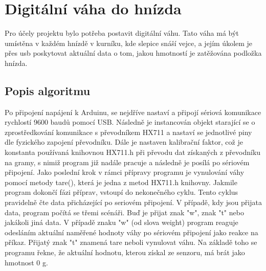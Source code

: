 \section{Digitální váha do hnízda}\label{sec:digitalni-vaha-do-hnizda}
Pro účely projektu bylo potřeba postavit digitální váhu.
Tato váha má být umístěna v každém hnízdě v kurníku, kde slepice snáší vejce, a jejím úkolem je přes \gls{usb} poskytovat aktuální data o tom, jakou hmotností je zatěžována podložka hnízda.

\subsection*{Popis algoritmu}
Po připojení napájení k Arduinu, se nejdříve nastaví a připojí sériová komunikace rychlostí 9600 baudů pomocí USB.
Následně je instancován objekt starající se o zprostředkování komunikace s převodníkem HX711 a nastaví se jednotlivé piny dle fyzického zapojení převodníku.
Dále je nastaven kalibrační faktor, což je konstanta používaná knihovnou HX711.h při převodu dat získaných z převodníku na gramy, s nimiž program již nadále pracuje a následně je posílá po sériovém připojení.
Jako poslední krok v rámci přípravy programu je vynulování váhy pomocí metody tare(), která je jedna z metod HX711.h knihovny.
Jakmile program dokončí fázi příprav, vstoupí do nekonečného cyklu.
Tento cyklus pravidelně čte data přicházející po seriovém připojení.
V případě, kdy jsou přijata data, program počítá se třemi scénáři.
Buď je přijat znak "w", znak "t" nebo jakákoli jiná data.
V případě znaku "w" (od slova weight) program reaguje odesláním aktuální naměřené hodnoty váhy po sériovém připojení jako reakce na příkaz.
Přijatý znak "t" znamená tare neboli vynulovat váhu.
Na základě toho se programu řekne, že aktuální hodnotu, kterou získal ze senzoru, má brát jako hmotnost 0 g.


